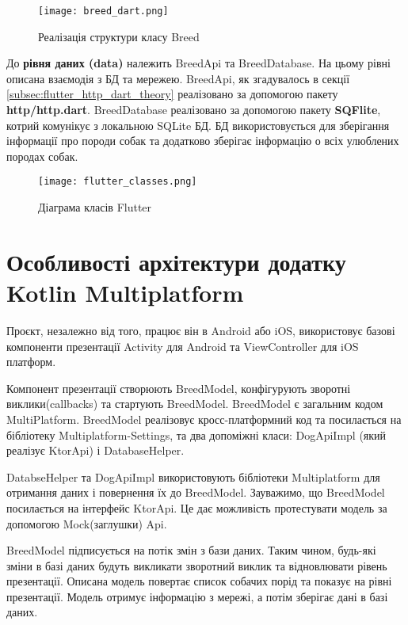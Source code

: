 \begin{figure}[h]
    \begin{center}
        \texttt{[image: breed\_dart.png]}
    \end{center}
    \caption{Реалізація структури класу Breed}
    \label{fig:flutter_breed_class}
\end{figure}
\FloatBarrier

До \textbf{рівня даних (data)} належить BreedApi та BreedDatabase. На цьому рівні описана взаємодія з БД та мережею.
BreedApi, як згадувалось в секції \ref{subsec:flutter_http_dart_theory} реалізовано за допомогою пакету \textbf{http/http.dart}.
BreedDatabase реалізовано за допомогою пакету \textbf{SQFlite}, котрий комунікує з локальною SQLite БД. БД використовується
для зберігання інформації про породи собак та додатково зберігає інформацію о всіх улюблених породах собак.

\begin{figure}
    \begin{center}
        \texttt{[image: flutter\_classes.png]}
    \end{center}
    \caption{Діаграма класів Flutter}
    \label{fig:flutter_classes}
\end{figure}


\section{Особливості архітектури додатку Kotlin Multiplatform}
\label{sec:kmm_architecture}

Проєкт, незалежно від того, працює він в Android або iOS, використовує базові компоненти презентації
Activity для Android та ViewController для iOS платформ.

Компонент презентації створюють BreedModel, конфігурують зворотні виклики(callbacks) та стартують BreedModel.
BreedModel є загальним кодом MultiPlatform.
BreedModel реалізовує кросс-платформний код та посилається на бібліотеку Multiplatform-Settings,
та два допоміжні класи: DogApiImpl (який реалізує KtorApi) і DatabaseHelper.

DatabseHelper та DogApiImpl використовують бібліотеки Multiplatform для отримання даних і повернення їх до BreedModel.
Зауважимо, що BreedModel посилається на інтерфейс KtorApi. Це дає можливість протестувати модель за допомогою Mock(заглушки) Api.

BreedModel підписується на потік змін з бази даних. Таким чином, будь-які зміни в базі даних будуть викликати
зворотний виклик та відновлювати рівень презентації.
Описана модель повертає список собачих порід та показує на рівні презентації.
Модель отримує інформацію з мережі, а потім зберігає дані в базі даних.

